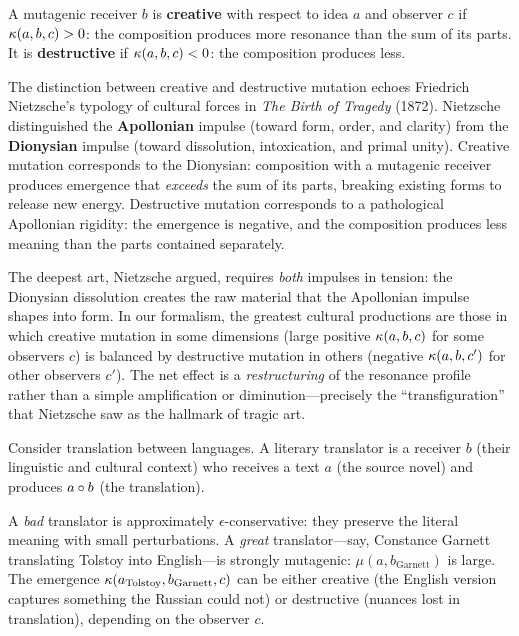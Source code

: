 \begin{definition}
\label{def:creative-destructive}
A mutagenic receiver $b$ is \textbf{creative} with respect to idea $a$ and
observer $c$ if $\kappa(a, b, c) > 0$: the composition produces more
resonance than the sum of its parts.  It is \textbf{destructive} if
$\kappa(a, b, c) < 0$: the composition produces less.
\end{definition}

\begin{interpretation}
\label{interp:ch9:creative_destructive_nietzsche}
The distinction between creative and destructive mutation echoes Friedrich
Nietzsche's typology of cultural forces in \emph{The Birth of Tragedy}
(1872).  Nietzsche distinguished the \textbf{Apollonian} impulse (toward
form, order, and clarity) from the \textbf{Dionysian} impulse (toward
dissolution, intoxication, and primal unity).  Creative mutation corresponds
to the Dionysian: composition with a mutagenic receiver produces emergence
that \emph{exceeds} the sum of its parts, breaking existing forms to release
new energy.  Destructive mutation corresponds to a pathological Apollonian
rigidity: the emergence is negative, and the composition produces less
meaning than the parts contained separately.

The deepest art, Nietzsche argued, requires \emph{both} impulses in tension:
the Dionysian dissolution creates the raw material that the Apollonian
impulse shapes into form.  In our formalism, the greatest cultural
productions are those in which creative mutation in some dimensions
(large positive $\kappa(a, b, c)$ for some observers $c$) is balanced by
destructive mutation in others (negative $\kappa(a, b, c')$ for other
observers $c'$).  The net effect is a \emph{restructuring} of the resonance
profile rather than a simple amplification or diminution---precisely the
``transfiguration'' that Nietzsche saw as the hallmark of tragic art.
\end{interpretation}



\begin{example}
\label{ex:translation}
Consider translation between languages.  A literary translator is a receiver
$b$ (their linguistic and cultural context) who receives a text $a$ (the source
novel) and produces $a \circ b$ (the translation).

A \emph{bad} translator is approximately $\epsilon$-conservative: they preserve
the literal meaning with small perturbations.  A \emph{great} translator---say,
Constance Garnett translating Tolstoy into English---is strongly mutagenic:
$\mu(a, b_{\mathrm{Garnett}})$ is large.  The emergence
$\kappa(a_{\mathrm{Tolstoy}}, b_{\mathrm{Garnett}}, c)$ can be either creative
(the English version captures something the Russian could not) or destructive
(nuances lost in translation), depending on the observer $c$.
\end{example}

